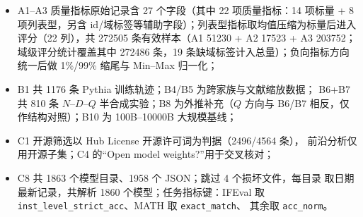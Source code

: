 \begin{itemize}
\item A1--A3 质量指标原始记录含 27 个字段（其中 22 项质量指标：14 项标量
+ 8 项列表型，另含 id/域标签等辅助字段）；列表型指标取均值压缩为标量后进入
评分（22 列），共 272505 条有效样本（A1 51230 + A2 17523 + A3 203752；
域级评分统计覆盖其中 272486 条，19 条缺域标签计入总量）；负向指标方向
统一后做 1\%/99\% 缩尾与 Min--Max 归一化；
\item B1 共 1176 条 Pythia 训练轨迹；B4/B5 为跨家族与文献缩放数据；
B6+B7 共 810 条 $N$--$D$--$Q$ 半合成实验；B8 为外推补充（$Q$ 方向与
B6/B7 相反，仅作结构对照）；B10 为 100B--10000B 大规模基线；
\item C1 开源筛选以 Hub License 开源许可词为判据（2496/4564 条），
前沿分析仅用开源子集；C4 的``Open model weights?''用于交叉核对；
\item C8 共 1863 个模型目录、1958 个 JSON；跳过 4 个损坏文件，每目录
取日期最新记录，共解析 1860 个模型；任务指标键：IFEval 取
\texttt{inst\_level\_strict\_acc}、MATH 取 \texttt{exact\_match}、
其余取 \texttt{acc\_norm}。
\end{itemize}